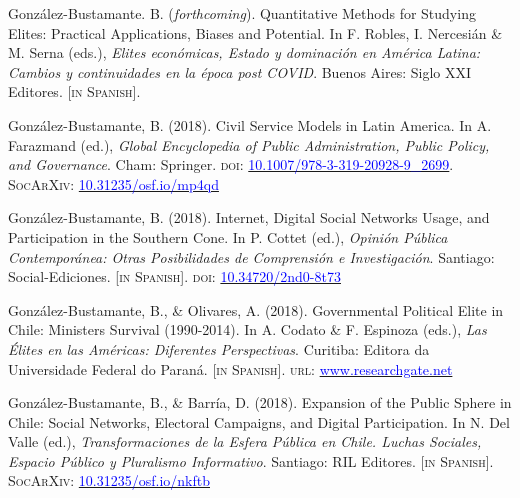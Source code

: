 \begin{publications}

\begin{benumerate}{13}

\item{\small González-Bustamante. B. ({\itshape forthcoming}). Quantitative Methods for Studying Elites: Practical Applications, Biases and Potential. In F. Robles, I. Nercesián \& M. Serna (eds.), {\itshape Elites económicas, Estado y dominación en América Latina: Cambios y continuidades en la época post COVID}. Buenos Aires: Siglo XXI Editores. {\footnotesize \scshape [in Spanish]}.}\vspace{1mm}

\item{\small Gonz\'alez-Bustamante, B. (2018). Civil Service Models in Latin America. In A. Farazmand (ed.), {\itshape Global Encyclopedia of Public Administration, Public Policy, and Governance}. Cham: Springer. {\scshape doi}: \href{https://doi.org/10.1007/978-3-319-20928-9\_2699}{\textcolor{blue}{10.1007/978-3-319-20928-9\_2699}}. {\scshape \footnotesize SocArXiv}: \href{https://doi.org/10.31235/osf.io/mp4qd}{\textcolor{blue}{10.31235/osf.io/mp4qd}}}\vspace{1mm}

\item{\small Gonz\'alez-Bustamante, B. (2018). Internet, Digital Social Networks Usage, and Participation in the Southern Cone. In P. Cottet (ed.), {\itshape Opini\'on P\'ublica Contempor\'anea: Otras Posibilidades de Comprensi\'on e Investigaci\'on}. Santiago: Social-Ediciones. {\footnotesize \scshape [in Spanish]}. {\scshape doi}: \href{https://doi.org/10.34720/2nd0-8t73}{\textcolor{blue}{10.34720/2nd0-8t73}}}\vspace{1mm}

\item{\small Gonz\'alez-Bustamante, B., \& Olivares, A. (2018). Governmental Political Elite in Chile: Ministers Survival (1990-2014). In A. Codato \& F. Espinoza (eds.), {\itshape Las \'Elites en las Am\'ericas: Diferentes Perspectivas}. Curitiba: Editora da Universidade Federal do Paraná. {\footnotesize \scshape [in Spanish]}. {\scshape url}: \href{https://www.researchgate.net/publication/325699783_Elites_en_las_Americas_diferentes_perspectivas_Elites_in_the_Americas_Different_Perspectives}{\textcolor{blue}{www.researchgate.net}}}\vspace{1mm}

\item{\small Gonz\'alez-Bustamante, B., \& Barr\'ia, D. (2018). Expansion of the Public Sphere in Chile: Social Networks, Electoral Campaigns, and Digital Participation. In N. Del Valle (ed.), {\itshape Transformaciones de la Esfera P\'ublica en Chile. Luchas Sociales, Espacio P\'ublico y Pluralismo Informativo}. Santiago: RIL Editores. {\footnotesize \scshape [in Spanish]}. {\scshape \footnotesize SocArXiv}: \href{https://doi.org/10.31235/osf.io/nkftb}{\textcolor{blue}{10.31235/osf.io/nkftb}}}\vspace{1mm}


\end{benumerate}
\end{publications}

